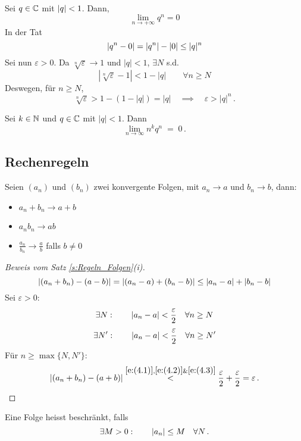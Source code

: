 \begin{Bsp}
  Sei $q\in\mathbb{C}$ mit $\mathopen| q \mathclose|<1$. Dann,
  \[\lim_{n\to+\infty}q^n=0\]
In der Tat \[\mathopen| q^n-0 \mathclose|=\mathopen| q^n \mathclose|-\mathopen| 0 \mathclose|\leq\mathopen| q \mathclose|^n\] 
Sei nun $\varepsilon>0$. Da $\sqrt[n]{\varepsilon} \to 1$ und $|q|<1$, $\exists N$ s.d.
\[|\sqrt[n]{\varepsilon} - 1| < 1- |q| \qquad\forall n\geq N\]
Deswegen, f\"ur $n\geq N$,
$$
\sqrt[n]{\varepsilon}> 1-(1-|q|) = |q| \quad \implies \quad
\varepsilon > |q|^n\, .
$$
\end{Bsp}
\begin{Ueb}
Sei $k\in \mathbb{N}$ und $q\in \mathbb{C}$ mit $|q|<1$. Dann
$$
\lim_{n\to\infty} n^k q^n\;=\; 0\, .
$$
\end{Ueb}

\subsection{Rechenregeln}
\begin{Sat}\label{s:Regeln_Folgen}
  Seien $(a_n)$ und $(b_n)$ zwei konvergente Folgen, mit $a_n\to a$ und $b_n\to b$, dann:
  \begin{itemize}
     \item[(ii)] $a_n+b_n\to a+b$
     \item[(i)] $a_n b_n\to ab$
     \item[(iii)] $\frac{a_n}{b_n}\to\frac{a}{b}$ falls $b\neq 0$
  \end{itemize}
\end{Sat}
\begin{proof}[Beweis vom Satz \ref{s:Regeln_Folgen}(i)]
  \begin{equation}\label{e:(4.1)}
\mathopen| \left( a_n+b_n \right)-\left( a-b \right) \mathclose|=\mathopen| \left( a_n-a \right)+\left( b_n-b 
  \right) \mathclose|\leq\mathopen| a_n-a \mathclose|+\mathopen| b_n-b \mathclose|
\end{equation}
  Sei $\varepsilon>0$:
  \begin{equation}\label{e:(4.2)}
\exists N:\qquad\mathopen| a_n-a \mathclose|<\frac{\varepsilon}{2}\quad\forall n\geq N
  \end{equation}
\begin{equation}\label{e:(4.3)}
\exists N':\qquad\mathopen| a_n-a \mathclose|<\frac{\varepsilon}{2}\quad\forall n\geq N'
\end{equation}
F\"ur $n\geq \max \{N, N'\}$:
$$
|(a_n+b_n)-(a+b)| \stackrel{\eqref{e:(4.1)},\eqref{e:(4.2)} \& \eqref{e:(4.3)}}{<}
\frac{\varepsilon}{2}+\frac{\varepsilon}{2} = \varepsilon\, .
$$
\end{proof}
\begin{Def}
  Eine Folge heisst beschränkt, falls
\begin{equation}\label{e:besch}
\exists M>0:\qquad \mathopen| a_n \mathclose|\leq M\quad \forall N\, .
\end{equation}
\end{Def}
